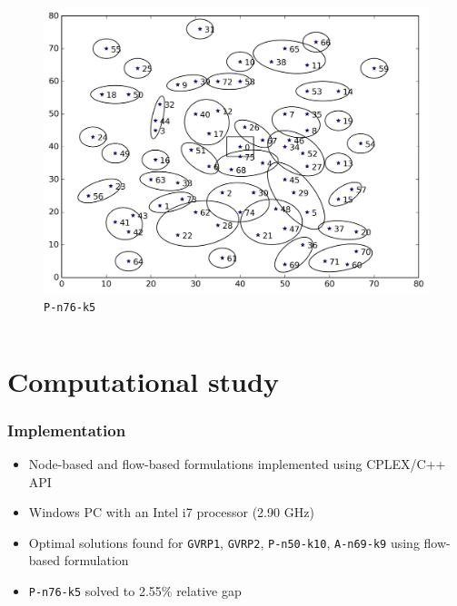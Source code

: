 \documentclass[11pt]{beamer}
\begin{document}
\begin{frame}
\begin{columns}[t,onlytextwidth]

\begin{figure}
\centering
\includegraphics[width=\linewidth]{Images/P-n76-k5-c38_map.png}
\caption{\texttt{P-n76-k5}}
\end{figure}

\end{columns}
\end{frame}


\section{Computational study}

\begin{frame}
\frametitle{Implementation}
\begin{itemize}
\item Node-based and flow-based formulations implemented using CPLEX/C++ API
\item Windows PC with an Intel i7 processor (2.90 GHz)
\item Optimal solutions found for \texttt{GVRP1}, \texttt{GVRP2}, \texttt{P-n50-k10}, \texttt{A-n69-k9} using flow-based formulation
\item \texttt{P-n76-k5} solved to 2.55\% relative gap
\end{itemize}
\end{frame}
\end{document}
